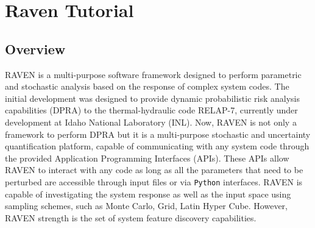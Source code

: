 \section{Raven Tutorial}
\label{sec:ravenTutorial}

\subsection{Overview}
\label{sub:overview}
RAVEN is a multi-purpose software framework designed to perform parametric and stochastic analysis based on the
response of complex system codes. The initial development was designed to provide dynamic probabilistic risk
analysis capabilities (DPRA) to the thermal-hydraulic code RELAP-7, currently under development at Idaho National
Laboratory (INL).
Now, RAVEN is not only a framework to perform DPRA but it is a multi-purpose stochastic and uncertainty 
quantification platform, capable of communicating with any system code through the provided  Application
Programming Interfaces (APIs). These APIs allow RAVEN to interact with any code as long as all the parameters
that need to be perturbed are accessible through input files or via  \texttt{Python} interfaces. RAVEN is capable
of investigating the system response as well as the input space using sampling schemes, such as Monte Carlo, Grid,
Latin Hyper Cube. However, RAVEN strength is the set of system feature discovery capabilities.


\pagebreak


